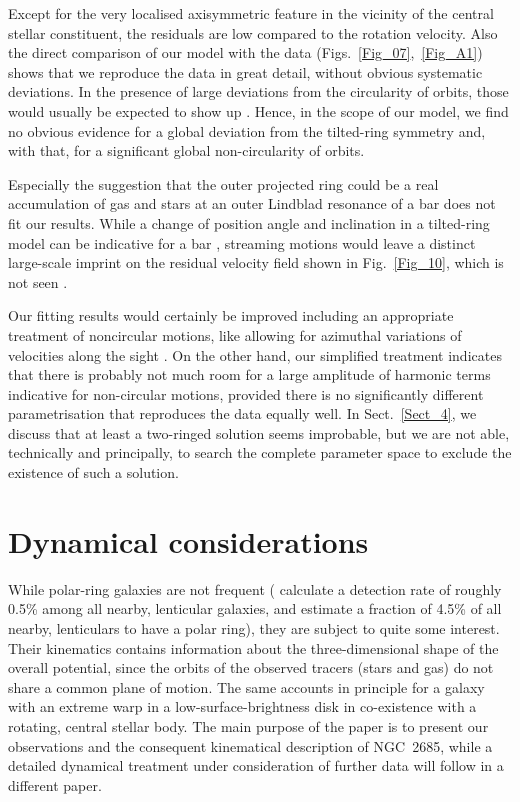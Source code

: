 \documentclass[oldversion]{aa}
\begin{document}
Except for the very localised axisymmetric feature in the vicinity of
the central stellar constituent, the residuals are low compared to the
rotation velocity. Also the direct comparison of our model with the
data (Figs.~\ref{Fig_07},~\ref{Fig_A1}) shows that we reproduce the
data in great detail, without obvious systematic deviations.  In the
presence of large deviations from the circularity of orbits, those
would usually be expected to show up
\citep[][]{Franx94,Schoenmakers97}.  Hence, in the scope of our model,
we find no obvious evidence for a global deviation from the
tilted-ring symmetry and, with that, for a significant global
non-circularity of orbits.

Especially the suggestion that the outer projected ring could be a
real accumulation of gas and stars at an outer Lindblad resonance of a
bar \citep[][]{Schinnerer02} does not fit our results. While a change
of position angle and inclination in a tilted-ring model can be
indicative for a bar
\citep[][]{Schinnerer02}, streaming motions would leave a distinct
large-scale imprint on the residual velocity field shown in
Fig.~\ref{Fig_10}, which is not seen \citep[see also][]{Erwin03}.

Our fitting results would certainly be improved including an
appropriate treatment of noncircular motions, like allowing for
azimuthal variations of velocities along the sight 
\citep[][]{Franx94,Schoenmakers97}. 
On the other hand, our simplified
treatment indicates that there is probably not much room for a large
amplitude of harmonic terms indicative for non-circular motions,
provided there is no significantly different parametrisation that
reproduces the data equally well. In Sect.~\ref{Sect_4}, we discuss
that at least a two-ringed solution seems improbable, but we are not
able, technically and principally, to search the complete parameter
space to exclude the existence of such a solution.
%
%
\section{Dynamical considerations}
\label{Sect_8}
While polar-ring galaxies are not frequent (\citealt{Whitmore90}
calculate a detection rate of roughly 0.5\% among all nearby,
lenticular galaxies, and estimate a fraction of 4.5\% of all nearby,
lenticulars to have a polar ring), they are subject to quite some
interest. Their kinematics contains information about the
three-dimensional shape of the overall potential, since the orbits of
the observed tracers (stars and gas) do not share a common plane of
motion. The same accounts in principle for a galaxy with an extreme
warp in a low-surface-brightness disk in co-existence with a rotating,
central stellar body. The main purpose of the paper is to present our
observations and the consequent kinematical description of NGC~2685,
while a detailed dynamical treatment under consideration of further
data will follow in a different paper.
\end{document}
